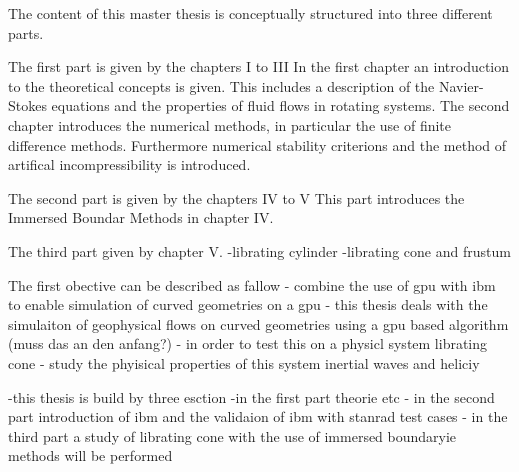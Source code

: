 \clearpage

The content of this  master thesis is conceptually structured into three different parts.

The first part is given by the  chapters \RN{1} to \RN{3}
In the first chapter an introduction to the theoretical concepts is given.
This includes a description of the Navier-Stokes equations and the properties of fluid flows in rotating systems.
The second chapter introduces the numerical methods, in particular the use of finite difference methods.
Furthermore numerical stability criterions and the method of artifical incompressibility is introduced.

The second part is given by the chapters \RN{4} to \RN{5}
This part introduces the Immersed Boundar Methods in chapter \RN{4}.

The third part given by chapter \RN{5}.
-librating cylinder
-librating cone and frustum

The first obective can  be described as fallow
- combine the use of gpu with ibm to enable simulation of curved geometries on a gpu
-  this thesis deals with the simulaiton of geophysical flows on  curved geometries using a gpu based algorithm (muss das an den anfang?)
- in order to test this on a physicl system  librating cone
- study the phyisical properties of this system inertial waves  and heliciy

-this thesis is build by three esction
-in the first part theorie etc
- in the second part introduction of ibm and the validaion of ibm with stanrad test cases
- in the third part a study of  librating cone with the use of immersed boundaryie methods will be performed












